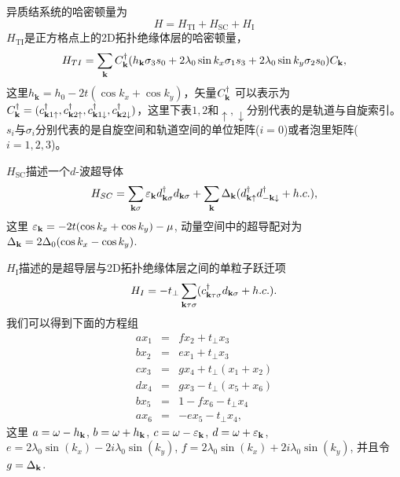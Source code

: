 异质结系统的哈密顿量为
\begin{equation}
H=H_\mathrm{TI}+H_\mathrm{SC}+H_\mathrm{I}
\end{equation}
$H_\mathrm{TI}$是正方格点上的2D拓扑绝缘体层的哈密顿量\cite{re56,re57}，
\begin{equation}
	\begin{aligned}
		H_{TI} =\sum_{{\bf k}}C_{{\bf k}}^\dagger (h_\mathbf{k}\sigma_3s_0+2\lambda_{0}\sin k_x\sigma_1s_3+2\lambda_0\sin k_y\sigma_2 s_0)C_{{\bf k}},
	\end{aligned}\label{tiham}
\end{equation}
这里$h_\mathbf{k}=h_0-2t(\cos k_x+\cos k_y)$，矢量$C^\dagger_{\bf k}$ 可以表示为$C^\dagger_{\bf k}=(c^\dagger_{{\bf k}1\uparrow},c^\dagger_{{\bf k}2\uparrow},c^\dagger_{{\bf k}1\downarrow},c^\dagger_{{\bf k}2\downarrow})$，这里下表$1,2$和$\uparrow,\downarrow$分别代表的是轨道与自旋索引。$s_i$与$\sigma_i$分别代表的是自旋空间和轨道空间的单位矩阵($i=0$)或者泡里矩阵($i=1,2,3$)。

$H_\mathrm{SC}$描述一个$d$-波超导体
\begin{equation}
	H_{SC}=\sum_{{\bf k}\sigma}\varepsilon_{\bf k}d^\dagger_{{\bf k}\sigma}d_{{\bf k}\sigma}+\sum_{{\bf k}}\Delta_{\bf k}(d^\dagger_{{\bf k}\uparrow}d^\dagger_{{-\bf k}\downarrow}+h.c.),
\end{equation}
这里 $\varepsilon_{\bf k}=-2t(\cos k_x+\cos k_y)-\mu$, 动量空间中的超导配对为 $\Delta_{\bf k}=2\Delta_0 (\cos k_x-\cos k_y)$.

$H_\mathrm{I}$描述的是超导层与2D拓扑绝缘体层之间的单粒子跃迁项
\begin{equation}
	H_{I}=-t_\perp \sum_{{\bf k}\tau\sigma}(c_{{\bf k}\tau\sigma}^\dagger d_{{\bf k}\sigma}+h.c.).
\end{equation}
我们可以得到下面的方程组
\begin{subequations}
	\begin{eqnarray}
		ax_1&=&fx_2+t_\perp x_3
		\\
		bx_2&=&ex_1+t_\perp x_3
		\\
		cx_3&=&gx_4+t_\perp (x_1+x_2)
		\\
		dx_4&=&gx_3-t_\perp (x_5+x_6)
		\\
		bx_5&=&1-fx_6-t_\perp x_4
		\\
		ax_6&=&-ex_5-t_\perp x_4,\label{eom2}
	\end{eqnarray}
\end{subequations}
这里 $a=\omega-h_{\bf k}$, $b=\omega + h_{\bf k}$, $c=\omega-\varepsilon_{\bf k}$,
$d=\omega+\varepsilon_{\bf k}$, $e=2\lambda_0\sin(k_x)-2i \lambda_0\sin(k_y)$, $f=2\lambda_0\sin(k_x) + 2i\lambda_0\sin(k_y)$,
并且令 $g = \Delta_{\bf k}$.

